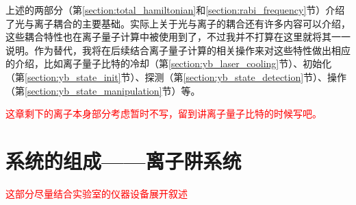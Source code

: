 上述的两部分（第\ref{section:total_hamiltonian}和\ref{section:rabi_frequency}节）介绍了光与离子耦合的主要基础。实际上关于光与离子的耦合还有许多内容可以介绍，这些耦合特性也在离子量子计算中被使用到了，不过我并不打算在这里就将其一一说明。作为替代，我将在后续结合离子量子计算的相关操作来对这些特性做出相应的介绍，比如离子量子比特的冷却（第\ref{section:yb_laser_cooling}节）、初始化（第\ref{section:yb_state_init}节）、探测（第\ref{section:yb_state_detection}节）、操作（第\ref{section:yb_state_manipulation}节）等。

\textcolor{red}{
这章剩下的离子本身部分考虑暂时不写，留到讲离子量子比特的时候写吧。}















\section[系统的组成——离子阱系统]{系统的组成——离子阱系统}
\textcolor{red}{这部分尽量结合实验室的仪器设备展开叙述}

